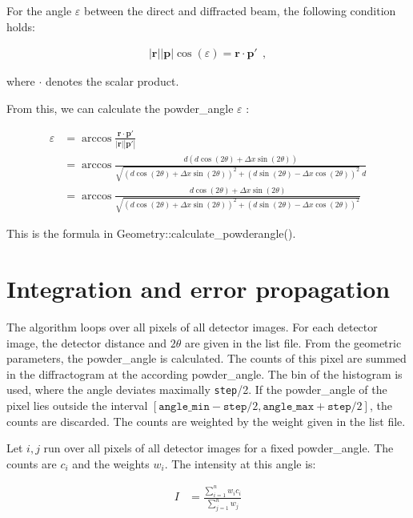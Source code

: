 \documentclass[a4paper, 12pt, twoside]{scrartcl}
\begin{document}
For the angle $ \varepsilon $ between the direct and diffracted beam, the following condition holds:

\begin{align*}
	|\boldsymbol{r}| |\boldsymbol{p}| \cos(\varepsilon) = \boldsymbol{r} \cdot \boldsymbol{p'}~~\mathrm{,}
\end{align*}

where $ \cdot $ denotes the scalar product.

From this, we can calculate the powder\_angle $ \varepsilon $ :

\begin{align*}
	\varepsilon &= \arccos \frac{\boldsymbol{r} \cdot \boldsymbol{p'}}{|\boldsymbol{r}||\boldsymbol{p'}|} \\
	&= \arccos \frac{d ( d\cos(2\theta) + \Delta x \sin(2\theta))}{\sqrt{(d\cos(2\theta) + \Delta x \sin(2\theta))^2 + (d\sin(2\theta) - \Delta x \cos(2\theta))^2}~d} \\
	&= \arccos \frac{d\cos(2\theta) + \Delta x \sin(2\theta)}{\sqrt{(d\cos(2\theta) + \Delta x \sin(2\theta))^2 + (d\sin(2\theta) - \Delta x \cos(2\theta))^2}}
\end{align*}

This is the formula in Geometry::calculate\_powderangle().

\section{Integration and error propagation}

The algorithm loops over all pixels of all detector images. For each detector image, the detector distance and $ 2\theta $ are given in the list file. From the geometric parameters, the powder\_angle is calculated. The counts of this pixel are summed in the diffractogram at the according powder\_angle. The bin of the histogram is used, where the angle deviates maximally \verb|step|/2. If the powder\_angle of the pixel lies outside the interval $ [\texttt{angle\_min} - \texttt{step}/2, \texttt{angle\_max} + \texttt{step}/2] $, the counts are discarded. The counts are weighted by the weight given in the list file.

Let $ i, j $ run over all pixels of all detector images for a fixed powder\_angle. The counts are $ c_i $ and the weights $ w_i $. The intensity at this angle is:

\begin{align*}
	I &= \frac{\sum\limits_{i = 1}^{n} w_i c_i}{\sum\limits_{j=1}^{n} w_j}
\end{align*}
\end{document}
